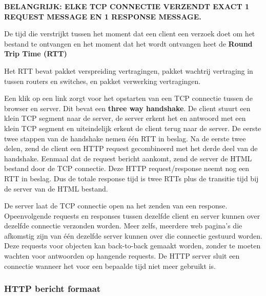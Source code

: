\noindent \textbf{BELANGRIJK: ELKE TCP CONNECTIE VERZENDT EXACT 1 REQUEST MESSAGE EN 1 RESPONSE MESSAGE.}

De tijd die verstrijkt tussen het moment dat een client een verzoek doet om het bestand te ontvangen en het moment dat het wordt ontvangen heet de \textbf{Round Trip Time (RTT)}

Het RTT bevat pakket verspreiding vertragingen, pakket wachtrij vertraging in tussen routers en switches, en pakket verwerking vertragingen.

Een klik op een link zorgt voor het opstarten van een TCP connectie tussen de browser en server. Dit bevat een \textbf{three way handshake}. De client stuurt een klein TCP segment naar de server, de server erkent het en antwoord met een klein TCP segment en uiteindelijk erkent de client terug naar de server. De eerste twee stappen van de handshake nemen één RTT in beslag. Na de eerste twee delen, zend de client een HTTP request gecombineerd met het derde deel van de handshake. Eenmaal dat de request bericht aankomt, zend de server de HTML bestand door de TCP connectie. Deze HTTP request/response neemt nog een RTT in beslag. Dus de totale response tijd is twee RTTs plus de transitie tijd bij de server van de HTML bestand.


De server laat de TCP connectie open na het zenden van een response. Opeenvolgende requests en responses tussen dezelfde client en server kunnen over dezelfde connectie verzonden worden. Meer zelfs, meerdere web pagina’s die afkomstig zijn van één dezelfde server kunnen over die connectie gestuurd worden. Deze requests voor objecten kan back-to-back gemaakt worden, zonder te moeten wachten voor antwoorden op hangende requests. De HTTP server sluit een connectie wanneer het voor een bepaalde tijd niet meer gebruikt is.

\clearpage

\subsubsection{HTTP bericht formaat}


